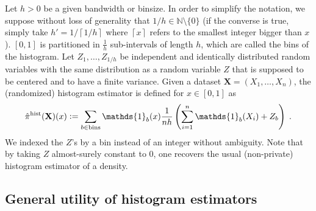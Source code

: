 \documentclass[10pt]{article} %
\def\Ind{\mathds{1}}
\newcommand{\N}[0]{\mathbb{N}}
\newcommand{\eqdef}{\vcentcolon=}
\newcommand\vect[1]{\mathbf{#1}}
\newcommand\p[1]{\left( {#1}\right)}
\newcommand\ceil[1]{\left\lceil {#1}\right\rceil}
\begin{document}
Let $h>0$ be a given bandwidth or binsize. In order to simplify the notation, we suppose  without loss of generality that $1/h \in \N \setminus \{0 \}$ (if the converse is true, simply take $h' = 1/\ceil{1/h}$ where $\ceil{x}$ refers to the smallest integer bigger than $x$). 
$[0, 1]$ is partitioned in $\frac{1}{h}$ sub-intervals of length $h$, which are called the bins of the histogram.
Let $Z_1, \dots, Z_{1/h}$ be independent and identically distributed random variables with the same distribution as a random variable $Z$ that is supposed to be centered and to have a finite variance. Given a dataset $\vect{X} = (X_1, \dots, X_n)$, the (randomized) histogram estimator is defined for $x\in[0,1]$ as 
\begin{equation}
\label{eq:hist}
    \hat{\pi}^{\mathrm{hist}} (\vect{X}) (x) \eqdef \sum_{b \in \mathrm{bins}} \Ind_b(x) \frac{1}{nh} \p{\sum_{i=1}^n \Ind_b(X_i) +Z_b}\;.
\end{equation}
We indexed the $Z$'s by a bin instead of an integer without ambiguity.
Note that by taking $Z$ almost-surely constant to $0$, one recovers the usual (non-private) histogram estimator of a density. %


\subsection{General utility of histogram estimators}
\end{document}
